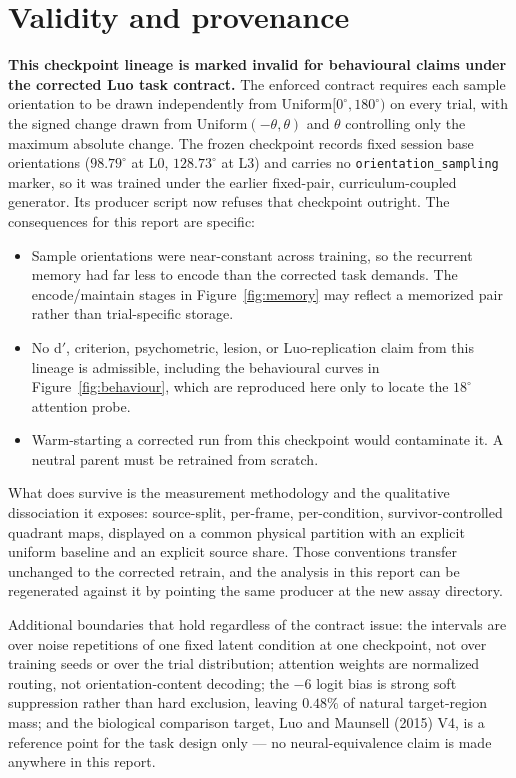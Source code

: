 \documentclass[10pt]{article}
\begin{document}
\section{Validity and provenance}\label{sec:validity}

\textcolor{WarnRed}{\textbf{This checkpoint lineage is marked invalid for behavioural claims
under the corrected Luo task contract.}} The enforced contract requires each sample
orientation to be drawn independently from $\mathrm{Uniform}[0^\circ,180^\circ)$ on every
trial, with the signed change drawn from $\mathrm{Uniform}(-\theta,\theta)$ and $\theta$
controlling only the maximum absolute change. The frozen checkpoint records fixed session
base orientations ($98.79^\circ$ at L0, $128.73^\circ$ at L3) and carries no
\texttt{orientation\_sampling} marker, so it was trained under the earlier
fixed-pair, curriculum-coupled generator. Its producer script now refuses that checkpoint
outright. The consequences for this report are specific:

\begin{itemize}
\item Sample orientations were near-constant across training, so the recurrent memory had far
less to encode than the corrected task demands. The encode/maintain stages in
Figure~\ref{fig:memory} may reflect a memorized pair rather than trial-specific storage.
\item No d$'$, criterion, psychometric, lesion, or Luo-replication claim from this lineage is
admissible, including the behavioural curves in Figure~\ref{fig:behaviour}, which are
reproduced here only to locate the $18^\circ$ attention probe.
\item Warm-starting a corrected run from this checkpoint would contaminate it. A neutral
parent must be retrained from scratch.
\end{itemize}

\vspace{6pt}
\noindent What does survive is the measurement methodology and the qualitative dissociation it
exposes: source-split, per-frame, per-condition, survivor-controlled quadrant maps, displayed
on a common physical partition with an explicit uniform baseline and an explicit source
share. Those conventions transfer unchanged to the corrected retrain, and the analysis in
this report can be regenerated against it by pointing the same producer at the new assay
directory.

Additional boundaries that hold regardless of the contract issue: the intervals are over
noise repetitions of one fixed latent condition at one checkpoint, not over training seeds or
over the trial distribution; attention weights are normalized routing, not orientation-content
decoding; the $-6$ logit bias is strong soft suppression rather than hard exclusion, leaving
$0.48\%$ of natural target-region mass; and the biological comparison target,
Luo and Maunsell (2015) V4, is a reference point for the task design only --- no
neural-equivalence claim is made anywhere in this report.
\end{document}
